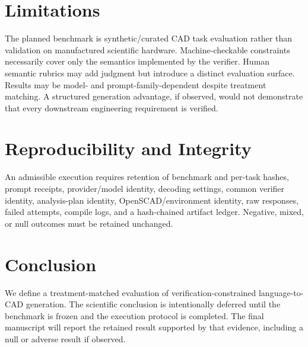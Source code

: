 \documentclass[conference]{IEEEtran}
\begin{document}
\section{Limitations}
The planned benchmark is synthetic/curated CAD task evaluation rather than validation on manufactured scientific hardware. Machine-checkable constraints necessarily cover only the semantics implemented by the verifier. Human semantic rubrics may add judgment but introduce a distinct evaluation surface. Results may be model- and prompt-family-dependent despite treatment matching. A structured generation advantage, if observed, would not demonstrate that every downstream engineering requirement is verified.

\section{Reproducibility and Integrity}
An admissible execution requires retention of benchmark and per-task hashes, prompt receipts, provider/model identity, decoding settings, common verifier identity, analysis-plan identity, OpenSCAD/environment identity, raw responses, failed attempts, compile logs, and a hash-chained artifact ledger. Negative, mixed, or null outcomes must be retained unchanged.

\section{Conclusion}
We define a treatment-matched evaluation of verification-constrained language-to-CAD generation. The scientific conclusion is intentionally deferred until the benchmark is frozen and the execution protocol is completed. The final manuscript will report the retained result supported by that evidence, including a null or adverse result if observed.
\end{document}
